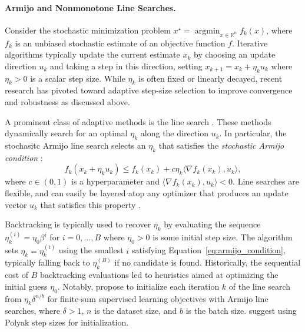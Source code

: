 \documentclass[10pt]{article} %
\newcommand{\xstar}{x^\star}
\newcommand{\xAt}[1]{x_{#1}}
\newcommand{\update}{u}
\newcommand{\updateAt}[1]{\update_{#1}}
\newcommand{\stepSize}{\eta}
\newcommand{\stepSizeInit}{\eta_0}
\newcommand{\stepSizeAt}[1]{\stepSize_{#1}}
\newcommand{\inner}[2]{\langle #1, #2 \rangle}
\DeclareMathOperator{\argmin}{argmin}
\begin{document}
\paragraph{Armijo and Nonmonotone Line Searches.}
Consider the stochastic minimization problem  $\xstar = \argmin_{x \in
\mathbb{R}^n} f_k(x)$, where $f_k$ is an unbiased stochastic estimate of an objective function $f$. Iterative algorithms typically update the current estimate $\xAt{k}$ by choosing an
update direction $\updateAt{k}$ and taking a step in this direction, setting $\xAt{k+1} = \xAt{k} + \stepSizeAt{k} \updateAt{k}$
where $\stepSizeAt{k} > 0$ is a scalar step size. While $\stepSizeAt{k}$ is often fixed or
linearly decayed, recent research has pivoted toward adaptive step-size selection to improve convergence and robustness as discussed above.

A prominent class of adaptive methods is the line search \citep{nocedal2006numerical,armijo1966minimization,vaswani2019painless,vaswani2025armijo,galli2023monotone,fox2024nonmonotone,fox2024glocal}. These methods
dynamically search for an optimal $\stepSizeAt{k}$ along the direction $\updateAt{k}$. In particular, the stochasitc Armijo line
search selects an $\stepSizeAt{k}$ that satisfies the \textit{stochastic Armijo condition} \citep{vaswani2019painless}:
%
\begin{equation}
        f_k(\xAt{k} + \stepSizeAt{k} \updateAt{k}) \le f_k(\xAt{k}) + c \stepSizeAt{k} \inner{\nabla f_k(\xAt{k})}{\updateAt{k}},
    \label{eq:armijo_condition}
\end{equation}
%
where $c \in (0, 1)$ is a hyperparameter and $\inner{\nabla f_k(\xAt{k})}{\updateAt{k}} < 0$. Line searches are flexible, and can easily be layered atop any optimizer that produces an update vector $\updateAt{k}$ that satisfies this property \citep{nocedal2006numerical,vaswani2025armijo,shea2024so}.

Backtracking is
typically used to recover $\stepSizeAt{k}$ by evaluating the sequence $\stepSizeAt{k}^{(i)} = \stepSizeInit \beta^i$ for $i = 0, \dots, B$ where $\stepSize_0 > 0$ is some initial step size. The algorithm sets $\stepSizeAt{k} = \stepSizeAt{k}^{(i)}$ using the smallest $i$ satisfying Equation~\ref{eq:armijo_condition}, typically falling back to $\stepSizeAt{k}^{(B)}$ if no candidate is found. Historically, the sequential cost of $B$ backtracking evaluations led to heuristics aimed at optimizing the initial guess $\stepSizeInit$. Notably, \cite{vaswani2019painless} propose to initialize each iteration $k$ of the line search from $\stepSizeAt{k} \delta^{n/b}$ for finite-sum supervised learning objectives with Armijo line searches, where $\delta > 1$, $n$ is the dataset size, and $b$ is the batch size. \cite{galli2023monotone} suggest using Polyak step sizes for initialization.
\end{document}
